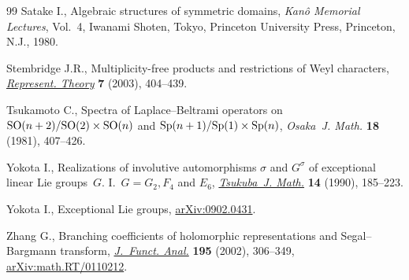 \documentclass[pdftex]{sigma}
\numberwithin{equation}{section}
\begin{document}
\begin{thebibliography}{99}
Satake I., Algebraic structures of symmetric domains, \textit{Kan\^{o} Memorial
 Lectures}, Vol.~4, Iwanami Shoten, Tokyo, Princeton University Press,
 Princeton, N.J., 1980.

Stembridge J.R., Multiplicity-free products and restrictions of {W}eyl
 characters, \href{https://doi.org/10.1090/S1088-4165-03-00150-X}{\textit{Represent. Theory}} \textbf{7} (2003), 404--439.

Tsukamoto C., Spectra of {L}aplace--{B}eltrami operators on {${\rm
 SO}(n+2)/{\rm SO}(2)\times {\rm SO}(n)$} and {${\rm Sp}(n+1)/{\rm
 Sp}(1)\times {\rm Sp}(n)$}, \textit{Osaka~J. Math.} \textbf{18} (1981),
 407--426.

Yokota I., Realizations of involutive automorphisms {$\sigma$} and {$G^\sigma$}
 of exceptional linear {L}ie groups~{$G$}. {I}.~{$G=G_2, F_4$} and {$E_6$},
 \href{https://doi.org/10.21099/tkbjm/1496161328}{\textit{Tsukuba~J. Math.}} \textbf{14} (1990), 185--223.

Yokota I., Exceptional {L}ie groups, \href{https://arxiv.org/abs/0902.0431}{arXiv:0902.0431}.

Zhang G., Branching coefficients of holomorphic representations and
 {S}egal--{B}argmann transform, \href{https://doi.org/10.1006/jfan.2002.3957}{\textit{J.~Funct. Anal.}} \textbf{195} (2002),
 306--349, \href{https://arxiv.org/abs/math.RT/0110212}{arXiv:math.RT/0110212}.

\end{thebibliography}\LastPageEnding
\end{document}
